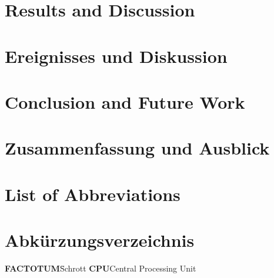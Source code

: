 \documentclass[oneside,11pt,a4paper,twoside]{scrreprt}
\begin{document}
\begin{onehalfspace}
	{\chapter{Results and Discussion}}
	{\chapter{Ereignisses und Diskussion}}
\label{cha:results_and_discussion}

\cleardoublepage

	{\chapter{Conclusion and Future Work}}
	{\chapter{Zusammenfassung und Ausblick}}
\label{cha:conclusion_and_future_work}

\cleardoublepage

\end{onehalfspace}
	{\printbibliography[title={References},heading=bibintoc]}
	{\printbibliography[title={Referenzen},heading=bibintoc]}
\cleardoublepage
{
	\chapter*{List of Abbreviations}
}
{
	\chapter*{Abkürzungsverzeichnis}
}
\begin{tabbing}
\textbf{FACTOTUM}\hspace{1cm}\=Schrott\kill
\textbf{CPU}\>Central Processing Unit
\end{tabbing}
\cleardoublepage

\small\normalsize
{}
\listoffigures
\small\normalsize
\cleardoublepage
\end{document}

